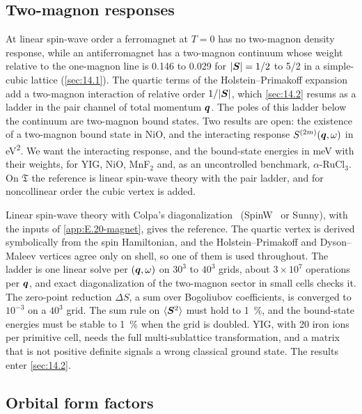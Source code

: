 \subsection{Two-magnon responses}

At linear spin-wave order a ferromagnet at $T = 0$ has no two-magnon density response, while an antiferromagnet has a two-magnon continuum whose weight relative to the one-magnon line is 0.146 to 0.029 for $|\bm{S}| = 1/2$ to 5/2 in a simple-cubic lattice (\cref{sec:14.1}). The quartic terms of the Holstein--Primakoff expansion add a two-magnon interaction of relative order $1/|\bm{S}|$, which \cref{sec:14.2} resums as a ladder in the pair channel of total momentum $\bm{q}$. The poles of this ladder below the continuum are two-magnon bound states. Two results are open: the existence of a two-magnon bound state in NiO, and the interacting response $S^{(2m)}(\bm{q},\omega)$ in \si{eV^2}. We want the interacting response, and the bound-state energies in meV with their weights, for YIG, NiO, MnF$_2$ and, as an uncontrolled benchmark, $\alpha$-RuCl$_3$. On $\mathfrak{T}$ the reference is linear spin-wave theory with the pair ladder, and for noncollinear order the cubic vertex is added.

Linear spin-wave theory with Colpa's diagonalization~\cite{colpa1978diagonalization} (SpinW~\cite{toth2015linear} or Sunny), with the inputs of \cref{app:E.20-magnet}, gives the reference. The quartic vertex is derived symbolically from the spin Hamiltonian, and the Holstein--Primakoff and Dyson--Maleev vertices agree only on shell, so one of them is used throughout. The ladder is one linear solve per $(\bm{q},\omega)$ on $30^3$ to $40^3$ grids, about $3\times10^7$ operations per $\bm{q}$, and exact diagonalization of the two-magnon sector in small cells checks it. The zero-point reduction $\Delta S$, a sum over Bogoliubov coefficients, is converged to $10^{-3}$ on a $40^3$ grid. The sum rule on $\langle\bm{S}^2\rangle$ must hold to \SI{1}{\percent}, and the bound-state energies must be stable to \SI{1}{\percent} when the grid is doubled. YIG, with 20 iron ions per primitive cell, needs the full multi-sublattice transformation, and a matrix that is not positive definite signals a wrong classical ground state. The results enter \cref{sec:14.2}.

\subsection{Orbital form factors}

